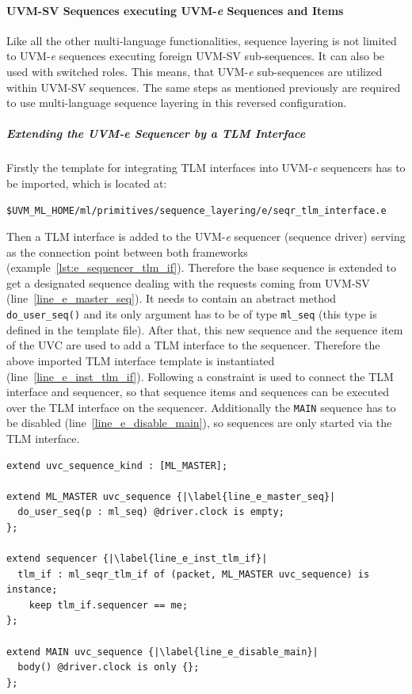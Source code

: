 \paragraph{UVM-SV Sequences executing UVM-\textit{e} Sequences and Items}
Like all the other multi-language functionalities, sequence layering is not limited to UVM-\textit{e} sequences executing foreign UVM-SV sub-sequences. It can also be used with switched roles. This means, that UVM-\textit{e} sub-sequences are utilized within UVM-SV sequences. The same steps as mentioned previously are required to use multi-language sequence layering in this reversed configuration. 
\subparagraph{Extending the UVM-\textit{e} Sequencer by a TLM Interface}\label{e_seqr_tlm}
Firstly the template for integrating TLM interfaces into UVM-\textit{e} sequencers has to be imported, which is located at:
\smallskip
{}
\begin{lstlisting}
$UVM_ML_HOME/ml/primitives/sequence_layering/e/seqr_tlm_interface.e
\end{lstlisting} 
\smallskip
Then a TLM interface is added to the UVM-\textit{e} sequencer (sequence driver) serving as the connection point between both frameworks (example~\ref{lst:e_sequencer_tlm_if}). Therefore the base sequence is extended to get a designated sequence dealing with the requests coming from UVM-SV (line~\ref{line_e_master_seq}). It needs to contain an abstract method \lstinline$do_user_seq()$ and its only argument has to be of type \lstinline$ml_seq$ (this type is defined in the template file).
After that, this new sequence and the sequence item of the UVC are used to add a TLM interface to the sequencer. Therefore the above imported TLM interface template is instantiated (line~\ref{line_e_inst_tlm_if}). Following a constraint is used to connect the TLM interface and sequencer, so that sequence items and sequences can be executed over the TLM interface on the sequencer.
Additionally the \lstinline$MAIN$ sequence has to be disabled (line~\ref{line_e_disable_main}), so sequences are only started via the TLM interface.
\lstset{language=e, numbers = left, escapechar=|, breaklines=true}
\begin{lstlisting}[frame=htrbl, caption={\textit{e}: adding a TLM interface to the UVM-\textit{e} sequencer},
label={lst:e_sequencer_tlm_if}]
extend uvc_sequence_kind : [ML_MASTER];

extend ML_MASTER uvc_sequence {|\label{line_e_master_seq}|
  do_user_seq(p : ml_seq) @driver.clock is empty;
};

extend sequencer {|\label{line_e_inst_tlm_if}|
  tlm_if : ml_seqr_tlm_if of (packet, ML_MASTER uvc_sequence) is instance;
    keep tlm_if.sequencer == me;
};

extend MAIN uvc_sequence {|\label{line_e_disable_main}|
  body() @driver.clock is only {};
};
\end{lstlisting}
